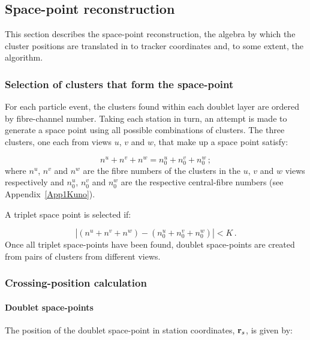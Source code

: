 \subsection{Space-point reconstruction}
\label{Sect:SciFiSpcPnt}

This section describes the space-point reconstruction, the algebra by which the cluster positions are translated in to tracker coordinates and, to some extent, the algorithm.

\subsubsection{Selection of clusters that form the space-point}

For each particle event, the clusters found within each doublet layer are ordered by fibre-channel number. Taking each station in turn, an attempt is made to generate a space point using all possible combinations of clusters. The three clusters, one each from views $u$, $v$ and $w$, that make up a space point satisfy:

\begin{equation}
 n^u + n^v + n^w = n^u_0 + n^v_0 + n^w_0 \, ;
\end{equation}
where $n^u$, $n^v$ and $n^w$ are the fibre numbers of the clusters in the $u$, $v$ and $w$ views respectively and $n^u_0$, $n^v_0$ and $n^w_0$ are the respective central-fibre numbers (see Appendix~\ref{App1Kuno}).

A triplet space point is selected if:

\begin{equation}
  | (n^u + n^v + n^w) - (n^u_0 + n^v_0 + n^w_0) | < K \, .
\end{equation}
Once all triplet space-points have been found, doublet space-points are created from pairs of clusters from different views.

\subsubsection{Crossing-position calculation}

\paragraph{Doublet space-points}
\label{Para:DoubletSpacepoint}

The position of the doublet space-point in station coordinates, ${\bf r}_s$, is given by:

